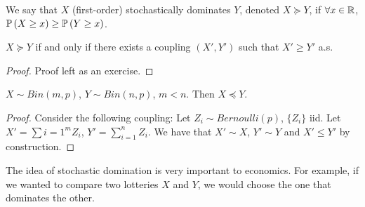 \documentclass[english, course]{Notes}
\begin{document}
\begin{definition}
We say that $X$ (first-order) stochastically dominates $Y$, denoted $X \succeq Y$, if $\forall x \in \mathbb{R}$, $\mathbb{P}\left(X \geq x\right) \geq \mathbb{P}\left(Y \geq x\right)$.
\end{definition}

\begin{theorem}
	$X \succeq Y$ if and only if there exists a coupling $(X', Y')$ such that $X' \geq Y'$ a.s.
\end{theorem}

\begin{proof}
	Proof left as an exercise.
\end{proof}

\begin{theorem}
	$X \sim Bin(m, p)$, $Y \sim Bin(n, p)$, $m < n$. Then $X \preceq Y$. 
\end{theorem}

\begin{proof}
	Consider the following coupling: Let $Z_i \sim Bernoulli(p)$, $\{Z_i\}$ iid. Let $X' = \sum{i=1}^m Z_i$, $Y' = \sum_{i = 1}^n Z_i$. We have that $X' \sim X$, $Y' \sim Y$ and $X' \leq Y'$ by construction. 
\end{proof}

The idea of stochastic domination is very important to economics. For example, if we wanted to compare two lotteries $X$ and $Y$, we would choose the one that dominates the other. 
\end{document}
